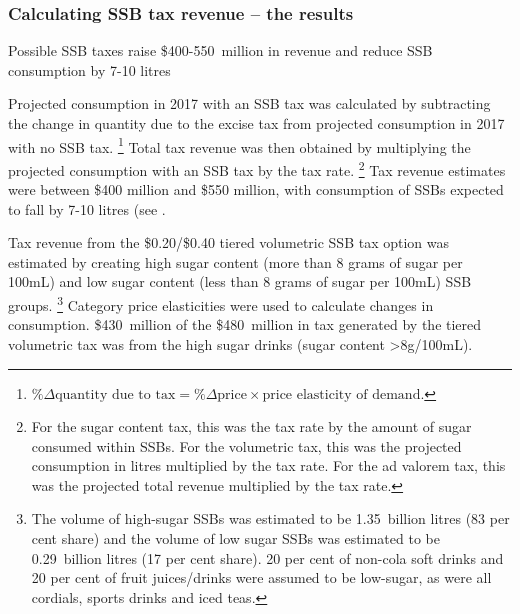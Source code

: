 \documentclass[embargoed]{grattan}
\begin{document}
\subsubsection{Calculating SSB tax revenue -- the results }\label{calculating-ssb-tax-revenue-the-results}

\begin{table}
\caption{Possible SSB taxes raise \$400-550~million in revenue and reduce SSB consumption by 7-10 litres}\label{tbl:SSB-taxes-raise-money}



\end{table}

Projected consumption in 2017 with an SSB tax was calculated by subtracting the change in quantity due to the excise tax from projected consumption in 2017 with no SSB tax.%
\footnote{\(\% \Delta \text{quantity due to tax} = \% \Delta \text{price} \times \text{price elasticity of demand}\).} 
Total tax revenue was then obtained by multiplying the projected consumption with an SSB tax by the tax rate.%
\footnote{For the sugar content tax, this was the tax rate by the amount of sugar consumed within SSBs.
For the volumetric tax, this was the projected consumption in litres multiplied by the tax rate.
For the ad valorem tax, this was the projected total revenue multiplied by the tax rate.} Tax revenue estimates were between \$400 million and \$550 million, with consumption of SSBs expected to fall by 7-10 litres (see .


Tax revenue from the \$0.20/\$0.40 tiered volumetric SSB tax option was estimated by creating high sugar content (more than 8 grams of sugar per 100mL) and low sugar content (less than 8 grams of sugar per 100mL) SSB groups.%
\footnote{The volume of high-sugar SSBs was estimated to be 1.35~billion litres (83 per cent share) and the volume of low sugar SSBs was estimated to be 0.29~billion litres (17 per cent share). 20 per cent of non-cola soft drinks and 20 per cent of fruit juices/drinks were assumed to be low-sugar, as were all cordials, sports drinks and iced teas.} Category price elasticities were used to calculate changes in consumption. \$430~million of the \$480~million in tax generated by the tiered volumetric tax was from the high sugar drinks (sugar content \textgreater{}8g/100mL).
\end{document}
